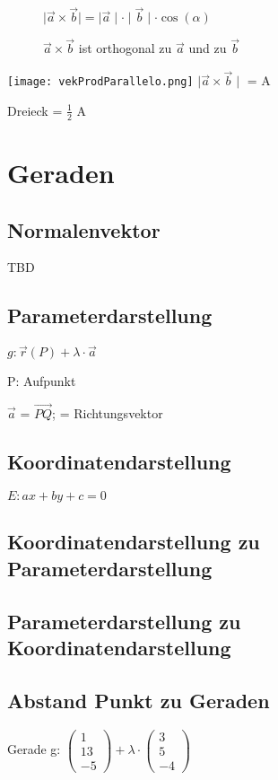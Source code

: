 \begin{multicols*}{3}
    \begin{wrapfigure}{r}{5.5cm}
        \vspace{-70pt}
        $ \mid \vec{a} \times \vec{b} \mid = \mid\vec{a}\mid \cdot \mid\vec{b}\mid \cdot \cos(\alpha) $

        {$\vec{a} \times \vec{b}$ ist orthogonal zu $\vec{a}$ und zu $\vec{b}$}
    \end{wrapfigure}

    \texttt{[image: vekProdParallelo.png]}
    { $\mid \vec{a} \times \vec{b} \mid $ = A }

    {Dreieck = $\frac{1}{2}$ A}

    \WhiteSpace


    \section{Geraden}
    \subsection{Normalenvektor}
    {TBD}

    \subsection{Parameterdarstellung}
    {\large $ g: \vec{r}(P) + \lambda \cdot \vec{a}  $}

    {P: Aufpunkt}

    {$ \vec{a}$ = $\overrightarrow{PQ} $;  = Richtungsvektor}


    \subsection{Koordinatendarstellung}
    {$E: ax + by + c= 0 $}
    \subsection{Koordinatendarstellung zu Parameterdarstellung }

    \subsection{Parameterdarstellung zu Koordinatendarstellung}

    \subsection{Abstand Punkt zu Geraden}
    { Gerade g: $ \begin{pmatrix}
                1  \\
                13 \\
                -5
            \end{pmatrix} + \lambda \cdot
            \begin{pmatrix}
                3 \\
                5 \\
                -4
            \end{pmatrix} $}


\end{multicols*}
